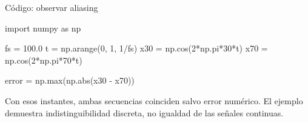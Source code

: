 \documentclass[
  ignorenonframetext,
  aspectratio=169,
  spanish,
]{beamer}
\newenvironment{Shaded}{\begin{snugshade}}{\end{snugshade}}
\newcommand{\BuiltInTok}[1]{\textcolor[rgb]{0.00,0.23,0.31}{#1}}
\newcommand{\DecValTok}[1]{\textcolor[rgb]{0.68,0.00,0.00}{#1}}
\newcommand{\FloatTok}[1]{\textcolor[rgb]{0.68,0.00,0.00}{#1}}
\newcommand{\ImportTok}[1]{\textcolor[rgb]{0.00,0.46,0.62}{#1}}
\newcommand{\NormalTok}[1]{\textcolor[rgb]{0.00,0.23,0.31}{#1}}
\newcommand{\OperatorTok}[1]{\textcolor[rgb]{0.37,0.37,0.37}{#1}}
\begin{document}
\begin{frame}[fragile]{Código: observar aliasing}
  \protect{}\label{cuxf3digo-observar-aliasing}
  \begin{Shaded}
    \begin{Highlighting}[]
      \ImportTok{import}\NormalTok{ numpy }\ImportTok{as}\NormalTok{ np}

      \NormalTok{fs }\OperatorTok{=} \FloatTok{100.0}
      \NormalTok{t }\OperatorTok{=}\NormalTok{ np.arange(}\DecValTok{0}\NormalTok{, }\DecValTok{1}\NormalTok{, }\DecValTok{1}\OperatorTok{/}\NormalTok{fs)}
      \NormalTok{x30 }\OperatorTok{=}\NormalTok{ np.cos(}\DecValTok{2}\OperatorTok{*}\NormalTok{np.pi}\OperatorTok{*}\DecValTok{30}\OperatorTok{*}\NormalTok{t)}
      \NormalTok{x70 }\OperatorTok{=}\NormalTok{ np.cos(}\DecValTok{2}\OperatorTok{*}\NormalTok{np.pi}\OperatorTok{*}\DecValTok{70}\OperatorTok{*}\NormalTok{t)}

      \NormalTok{error }\OperatorTok{=}\NormalTok{ np.}\BuiltInTok{max}\NormalTok{(np.}\BuiltInTok{abs}\NormalTok{(x30 }\OperatorTok{{-}}\NormalTok{ x70))}
    \end{Highlighting}
  \end{Shaded}

  \begin{tcolorbox}[enhanced jigsaw, arc=.35mm, bottomrule=.15mm, bottomtitle=1mm, breakable, colback=white, colbacktitle=quarto-callout-note-color!10!white, colframe=quarto-callout-note-color-frame, coltitle=black, left=2mm, leftrule=.75mm, opacityback=0, opacitybacktitle=0.6, rightrule=.15mm, title=\textcolor{quarto-callout-note-color}{\faInfo}\hspace{0.5em}{Nota}, titlerule=0mm, toprule=.15mm, toptitle=1mm]

    Con esos instantes, ambas secuencias coinciden salvo error numérico. El
    ejemplo demuestra indistinguibilidad discreta, no igualdad de las
    señales continuas.

  \end{tcolorbox}
\end{frame}
\end{document}
